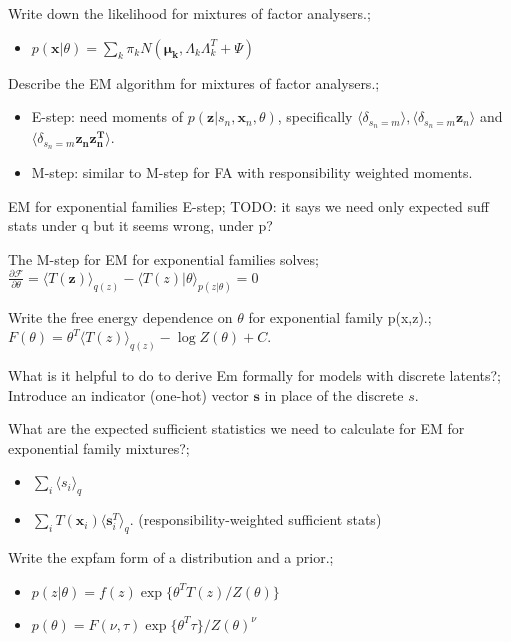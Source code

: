 \documentclass{article}
\begin{document}
Write down the likelihood for mixtures of factor analysers.; \begin{itemize} \item $p(\mathbf{x}|\theta) = \sum_k \pi_k N(\mathbf{\mu_k}, \Lambda_k\Lambda_k^T + \Psi)$ \end{itemize}

Describe the EM algorithm for mixtures of factor analysers.; \begin{itemize} \item E-step: need moments of $p(\mathbf{z}|s_n, \mathbf{x}_n, \theta)$, specifically $\langle \delta_{s_n=m}\rangle, \langle\delta_{s_n=m}\mathbf{z}_n\rangle$ and $\langle \delta_{s_n=m}\mathbf{z_nz_n^T}\rangle$.  \item M-step: similar to M-step for FA with responsibility weighted moments.  \end{itemize} 

EM for exponential families E-step; TODO: it says we need only expected suff stats under q but it seems wrong, under p?

The M-step for EM for exponential families solves; $\frac{\partial \mathcal{F}}{\partial \theta}= \langle T(\mathbf{z})\rangle_{q(z)} - \langle T(z)|\theta \rangle_{p(z|\theta)} = 0$

Write the free energy dependence on $\theta$ for exponential family p(x,z).; $F(\theta) = \theta^T\langle T(z) \rangle_{q(z)} - \log Z(\theta) + C$.

What is it helpful to do to derive Em formally for models with discrete latents?; Introduce an indicator (one-hot) vector $\mathbf{s}$ in place of the discrete $s$.

What are the expected sufficient statistics we need to calculate for EM for exponential family mixtures?; \begin{itemize} \item $\sum_i \langle s_i \rangle_{q}$ \item $\sum_i T(\mathbf{x}_i)\langle \mathbf{s}_i^T \rangle_q$. (responsibility-weighted sufficient stats) \end{itemize}

Write the expfam form of a distribution and a prior.; \begin{itemize} \item $p(z|\theta) = f(z)\exp\{\theta^T T(z)/Z(\theta)\}$ \item $p(\theta) = F(\nu, \tau)\exp\{\theta^T\tau\}/Z(\theta)^\nu$ \end{itemize}
\end{document}
